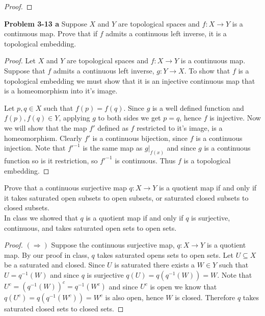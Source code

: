 \documentclass[minion]{homework651}
\begin{document}
\begin{problems}
\begin{proof}
\end{proof}


\problem\textbf{Problem 3-13 a} Suppose $X$ and $Y$ are topological spaces and $f: X \to Y$ is a continuous map. Prove that if $f$ admits 
a continuous left inverse, it is a topological embedding. 

\begin{proof}Let $X$ and $Y$ are topological spaces and $f: X \to Y$ is a continuous map. Suppose that $f$ admits 
    a continuous left inverse, $g: Y \to X$. To show that $f$ is a topological embedding we must show that it is an injective continuous map 
    that is a homeomorphism into it's image.


    Let $p, q \in X$ such that $f(p) = f(q)$. Since $g$ is a well defined function and $f(p), f(q) \in Y$, applying $g$ to both sides we get $p = q$, hence $f$ is injective. 
    Now we will show that the map $f'$ defined as $f$ restricted to it's image, is a homeomorphism. Clearly $f'$ is a continuous bijection, since $f$ is a continuous injection. Note that $f'^{-1}$ is the same map as $g|_{f(x)}$ and since $g$
    is a continuous function so is it restriction, so $f'^{-1}$ is continuous. Thus $f$ is a topological embedding. 
\end{proof}


\problem {} Prove that a continuous surjective map $q: X \to Y$ is a quotient map if and only if it takes saturated open subsets to open subsets, 
or saturated closed subsets to closed subsets.\\

In class we showed that $q$ is a quotient map if and only if $q$ is surjective, continuous, and takes saturated open sets to open sets. \\


\begin{proof}$(\Rightarrow)$ Suppose the continuous surjective map, $q: X \to Y$ is a quotient map. By our proof in class, $q$ takes saturated opens sets to open sets. 
    Let $U \subseteq X$ be a saturated and closed. Since $U$ is saturated there exists a $W \in Y$ such that $U = q^{-1}(W)$ and since $q$ is surjective $q(U) = q(q^{-1}(W)) = W$.
    Note that $U^c = (q^{-1}(W))^c = q^{-1}(W^c)$ and since $U^c$ is open we know that $q(U^c) = q(q^{-1}(W^c)) = W^c$ is also open, hence $W$ is closed. Therefore $q$ takes saturated closed sets to closed sets. 
\end{proof}



\end{problems}
\end{document}
